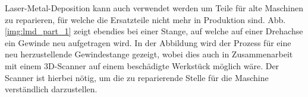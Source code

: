 \documentclass[../main.tex]{subfiles}
\begin{document}
Laser-Metal-Deposition kann auch verwendet werden um Teile für alte Maschinen zu reparieren, für welche die Ersatzteile nicht mehr in Produktion sind.
Abb. \ref{img:lmd_part_1} zeigt ebendies bei einer Stange, auf welche auf einer Drehachse ein Gewinde neu aufgetragen wird. In der Abbildung wird der Prozess für eine neu herzustellende Gewindestange gezeigt, wobei dies auch in Zusammenarbeit mit einem 3D-Scanner auf einem beschädigte Werkstück möglich wäre. Der Scanner ist hierbei nötig, um die zu reparierende Stelle für die Maschine verständlich darzustellen.
\end{document}
